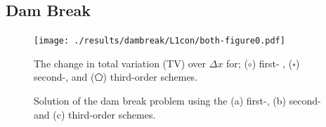 \documentclass[SingleSpace,12pt]{Serre_ASCE}
\begin{document}
\subsection{Dam Break}
\begin{figure}[htb]
\begin{center}
\texttt{[image: ./results/dambreak/L1con/both-figure0.pdf]}
\end{center}
\caption{The change in total variation (TV) over $\Delta x$ for; ($\circ$) first- , ($\square$) second-, and ($\pentagon$) third-order schemes.}
\label{fig:DBL1}
\end{figure}
\begin{figure}[htb]
\caption{Solution of the dam break problem using the (a) first-, (b) second- and (c) third-order schemes.}
\label{fig:DB}
\end{figure}
\end{document}
